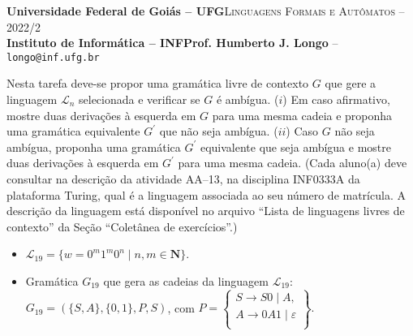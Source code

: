 \documentclass[12pt]{article}
\def\discente{Rafael Nunes Moreira Costa}
\def\matricula{202107855}
\def\ua{13}
\def\myling{{19}} %
\begin{document}
 \begin{tcolorbox}[rounded corners, colback=blue!3, colframe=blue!40!black]
  \footnotesize\textbf{Universidade Federal de Goiás -- UFG}\hfill \textsc{Linguagens Formais e Autômatos -- 2022/2}\\
  \footnotesize\textbf{Instituto de Informática -- INF\hfill Prof. Humberto J. Longo} -- \scriptsize\texttt{longo@inf.ufg.br}
 \end{tcolorbox}\bigskip
%
\begin{tcolorbox}[rounded corners, colback=blue!2, colframe=blue!40!black, title=\textbf{Atividade AA-\ua}]
  Nesta tarefa deve-se propor uma gramática livre de contexto $G$ que gere a linguagem $\mathcal{L}_n$ selecionada e verificar se $G$ é ambígua. ($i$) Em caso afirmativo, mostre duas derivações à esquerda em $G$ para uma mesma cadeia e proponha uma gramática equivalente $G^\prime$ que não seja ambígua. ($ii$) Caso $G$ não seja ambígua, proponha uma gramática $G^\prime$ equivalente que seja ambígua e mostre duas derivações à esquerda em $G^\prime$ para uma mesma cadeia. (Cada aluno(a) deve consultar na descrição da atividade AA--\ua, na disciplina INF0333A da plataforma Turing, qual é a linguagem associada ao seu número de matrícula. A descrição da linguagem está disponível no arquivo ``Lista de linguagens livres de contexto'' da Seção ``Coletânea de exercícios''.)
\end{tcolorbox}\bigskip

%
\begin{tcolorbox}[rounded corners, colback=yellow!5, colframe=red!40!black, title={\discente\ (\matricula)}]
\begin{itemize}
  \item $\mathcal{L}_{\myling} =  \{w = 0^m1^m0^n \mid n,m \in \mathbf{N}\}$.
  \item Gramática $G_{\myling}$ que gera as cadeias da linguagem $\mathcal{L}_{\myling}$:\\ $G_{\myling}=(\{S,A\},\{0,1\},P,S)$, com
  $
   P =
   \left\{\begin{array}{l}
    S\to S0\mid A,           \\
    A\to 0A1\mid \varepsilon \\
   \end{array}\right\}.
  $
 \end{itemize}
\end{tcolorbox}\bigskip
\end{document}
